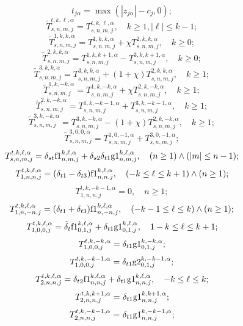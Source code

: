 \begin{theorem}
\begin{equation*}
{t_{j\alpha }} = \max (|{z_{j\alpha }}| - {c_j},0);
\end{equation*}
\begin{equation*}
\tilde T_{s,n,m,j}^{t,k,\ell ,\alpha } = T_{s,n,m,j}^{t,k,\ell ,\alpha },\quad k\ge 1, |\ell|\le k-1;
\end{equation*}
\begin{equation*}
\tilde T_{s,n,m,j}^{1,k,k,\alpha } = T_{s,n,m,j}^{1,k,k,\alpha } + \chi T_{s,n,m,j}^{2,k,k,\alpha },\quad k\ge 0;
\end{equation*}
\[\tilde T_{s,n,m,j}^{2,k,k,\alpha } = T_{s,n,m,j}^{1,k,k + 1,\alpha } - T_{s,n,m,j}^{3,k,k + 1,\alpha },\quad k\ge 0;\]
\[\tilde T_{s,n,m,j}^{3,k,k,\alpha } = T_{s,n,m,j}^{3,k,k,\alpha } + (1 + \chi )T_{s,n,m,j}^{2,k,k,\alpha },\quad k\ge 1;\]
\[\tilde T_{s,n,m,j}^{1,k, - k,\alpha } = T_{s,n,m,j}^{1,k, - k,\alpha } + \chi T_{s,n,m,j}^{2,k, - k,\alpha },\quad k\ge 1;\]
\[\tilde T_{s,n,m,j}^{2,k, - k,\alpha } = T_{s,n,m,j}^{1,k, - k - 1,\alpha } + T_{s,n,m,j}^{3,k, - k - 1,\alpha },\quad k\ge 1;\]
\[\tilde T_{s,n,m,j}^{3,k, - k,\alpha } = T_{s,n,m,j}^{3,k, - k,\alpha } - (1 + \chi )T_{s,n,m,j}^{2,k, - k,\alpha },\quad k\ge 1;\]
\[\tilde T_{s,n,m,j}^{3,0,0,\alpha } = T_{s,n,m,j}^{1,0, - 1,\alpha } + T_{s,n,m,j}^{3,0, - 1,\alpha };\]
\[T_{s,n,m,j}^{t,k,\ell ,\alpha } = {\delta _{st}}{\rm{f1}}_{n,m,j}^{k,\ell ,\alpha } + {\delta _{s2}}{\delta _{t1}}{\rm g1}_{n,m,j}^{k,\ell ,\alpha },\quad(n \ge 1) \wedge (\left| m \right| \le n - 1);\]
\[T_{1,n,n,j}^{t,k,\ell ,\alpha } = ({\delta _{t1}} - {\delta _{t3}}){\rm{f1}}_{n,n,j}^{k,\ell ,\alpha },\quad( - k \le \ell  \le k + 1) \wedge (n \ge 1);\]
\[T_{1,n,n,j}^{t,k, - k - 1,\alpha } = 0,\quad n\ge 1;\]
\[T_{1,n, - n,j}^{t,k,\ell ,\alpha } = ({\delta _{t1}} + {\delta _{t3}}){\rm{f1}}_{n, - n,j}^{k,\ell ,\alpha },\quad( - k - 1 \le \ell  \le k) \wedge (n \ge 1);\]
\[T_{1,0,0,j}^{t,k,\ell ,\alpha } = {\tilde \delta _t}{\rm{f1}}_{0,1,j}^{k,\ell ,\alpha } + {\delta _{t1}}{\rm g1}_{0,1,j}^{k,\ell ,\alpha },\quad 1 - k \le \ell  \le k + 1;\]
\[T_{1,0,0,j}^{t,k, - k,\alpha } = {\delta _{t1}}{\rm g1}_{0,1,j}^{k, - k,\alpha };\]
\[T_{1,0,0,j}^{t,k, - k - 1,\alpha } = {\delta _{t1}}{\rm g2}_{0,1,j}^{k, - k - 1,\alpha };\]
\[T_{2,n,n,j}^{t,k,\ell ,\alpha } = {\delta _{t2}}{\rm{f1}}_{n,n,j}^{k,\ell ,\alpha } + {\delta _{t1}}{\rm g1}_{n,n,j}^{k,\ell ,\alpha },\quad - k \le \ell  \le k;\]
\[T_{2,n,n,j}^{t,k, k + 1,\alpha } =  {\mkern 1mu} {\delta _{t1}}{\rm g1}_{n,n,j}^{k, k+1,\alpha };\]
\[T_{2,n,n,j}^{t,k, - k - 1,\alpha } =  {\mkern 1mu} {\delta _{t1}}{\rm g1}_{n,n,j}^{k, - k - 1,\alpha };\]

\end{theorem}
